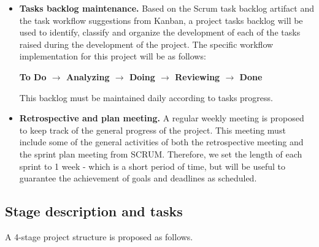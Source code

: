 \documentclass[11pt]{article}
\begin{document}
\begin{itemize}
\item \textbf{Tasks backlog maintenance.} Based on the Scrum task backlog artifact and the task workflow suggestions from Kanban, a project tasks backlog will be used to identify, classify and organize the development of each of the tasks raised during the development of the project. The specific workflow implementation for this project will be as follows:
\begin{center}
\textbf{To Do $\rightarrow$ Analyzing $\rightarrow$ Doing $\rightarrow$ Reviewing $\rightarrow$ Done}
\end{center}
This backlog must be maintained daily according to tasks progress.
\item \textbf{Retrospective and plan meeting.} A regular weekly meeting is proposed to keep track of the general progress of the project. This meeting must include some of the general activities of both the retrospective meeting and the sprint plan meeting from SCRUM. Therefore, we set the length of each sprint to 1 week - which is a short period of time, but will be useful to guarantee the achievement of goals and deadlines as scheduled.
\end{itemize}

\subsection{Stage description and tasks}
\label{sec:stage}

A 4-stage project structure is proposed as follows.
\end{document}
